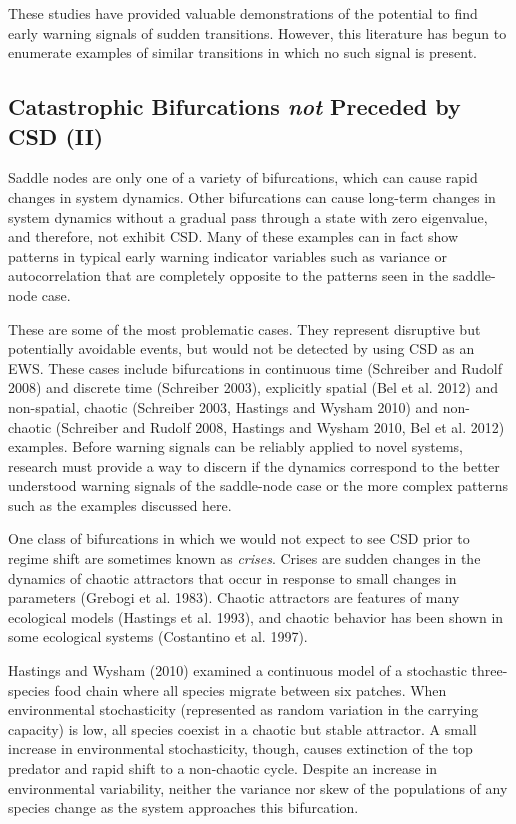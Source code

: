 \documentclass{article}
\begin{document}
These studies have provided valuable demonstrations of the potential to
find early warning signals of sudden transitions. However, this
literature has begun to enumerate examples of similar transitions in
which no such signal is present.

\subsection{Catastrophic Bifurcations \emph{not} Preceded by CSD (II)}

Saddle nodes are only one of a variety of bifurcations, which can cause
rapid changes in system dynamics. Other bifurcations can cause long-term
changes in system dynamics without a gradual pass through a state with
zero eigenvalue, and therefore, not exhibit CSD. Many of these examples
can in fact show patterns in typical early warning indicator variables
such as variance or autocorrelation that are completely opposite to the
patterns seen in the saddle-node case.

These are some of the most problematic cases. They represent disruptive
but potentially avoidable events, but would not be detected by using CSD
as an EWS. These cases include bifurcations in continuous time
(Schreiber and Rudolf 2008) and discrete time (Schreiber 2003),
explicitly spatial (Bel et al. 2012) and non-spatial, chaotic (Schreiber
2003, Hastings and Wysham 2010) and non-chaotic (Schreiber and Rudolf
2008, Hastings and Wysham 2010, Bel et al. 2012) examples. Before
warning signals can be reliably applied to novel systems, research must
provide a way to discern if the dynamics correspond to the better
understood warning signals of the saddle-node case or the more complex
patterns such as the examples discussed here.

One class of bifurcations in which we would not expect to see CSD prior
to regime shift are sometimes known as \emph{crises}. Crises are sudden
changes in the dynamics of chaotic attractors that occur in response to
small changes in parameters (Grebogi et al. 1983). Chaotic attractors
are features of many ecological models (Hastings et al. 1993), and
chaotic behavior has been shown in some ecological systems (Costantino
et al. 1997).

Hastings and Wysham (2010) examined a continuous model of a stochastic
three-species food chain where all species migrate between six patches.
When environmental stochasticity (represented as random variation in the
carrying capacity) is low, all species coexist in a chaotic but stable
attractor. A small increase in environmental stochasticity, though,
causes extinction of the top predator and rapid shift to a non-chaotic
cycle. Despite an increase in environmental variability, neither the
variance nor skew of the populations of any species change as the system
approaches this bifurcation.
\end{document}
